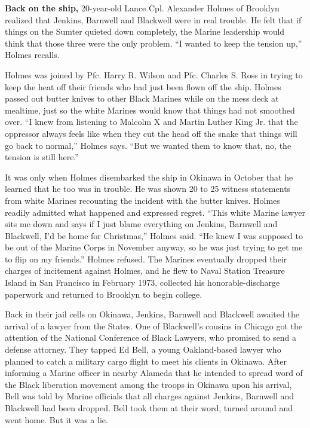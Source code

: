 \textbf{Back on the ship,} 20-year-old Lance Cpl. Alexander Holmes of
Brooklyn realized that Jenkins, Barnwell and Blackwell were in real
trouble. He felt that if things on the Sumter quieted down completely,
the Marine leadership would think that those three were the only
problem. ``I wanted to keep the tension up,'' Holmes recalls.

Holmes was joined by Pfc. Harry R. Wilson and Pfc. Charles S. Ross in
trying to keep the heat off their friends who had just been flown off
the ship. Holmes passed out butter knives to other Black Marines while
on the mess deck at mealtime, just so the white Marines would know that
things had not smoothed over. ``I knew from listening to Malcolm X and
Martin Luther King Jr. that the oppressor always feels like when they
cut the head off the snake that things will go back to normal,'' Holmes
says. ``But we wanted them to know that, no, the tension is still
here.''

It was only when Holmes disembarked the ship in Okinawa in October that
he learned that he too was in trouble. He was shown 20 to 25 witness
statements from white Marines recounting the incident with the butter
knives. Holmes readily admitted what happened and expressed regret.
``This white Marine lawyer sits me down and says if I just blame
everything on Jenkins, Barnwell and Blackwell, I'd be home for
Christmas,'' Holmes said. ``He knew I was supposed to be out of the
Marine Corps in November anyway, so he was just trying to get me to flip
on my friends.'' Holmes refused. The Marines eventually dropped their
charges of incitement against Holmes, and he flew to Naval Station
Treasure Island in San Francisco in February 1973, collected his
honorable-discharge paperwork and returned to Brooklyn to begin college.

Back in their jail cells on Okinawa, Jenkins, Barnwell and Blackwell
awaited the arrival of a lawyer from the States. One of Blackwell's
cousins in Chicago got the attention of the National Conference of Black
Lawyers, who promised to send a defense attorney. They tapped Ed Bell, a
young Oakland-based lawyer who planned to catch a military cargo flight
to meet his clients in Okinawa. After informing a Marine officer in
nearby Alameda that he intended to spread word of the Black liberation
movement among the troops in Okinawa upon his arrival, Bell was told by
Marine officials that all charges against Jenkins, Barnwell and
Blackwell had been dropped. Bell took them at their word, turned around
and went home. But it was a lie.

